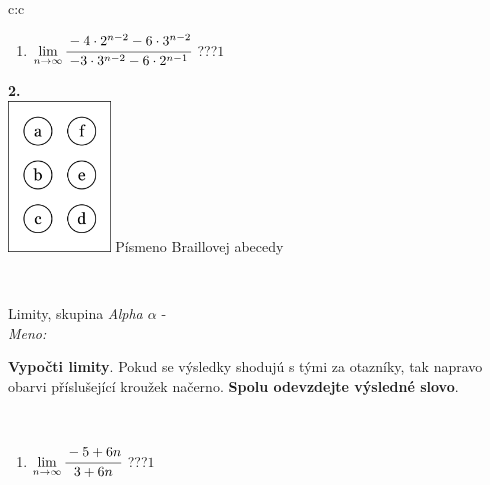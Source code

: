 \documentclass[10pt]{report}
\begin{document}
\begin{tabular}{c:c}
\begin{minipage}[c][104.5mm][t]{0.5\linewidth}
\begin{center}
\begin{minipage}{0.79\linewidth}
\begin{center}
\begin{varwidth}{\linewidth}
\begin{enumerate}
\item $\lim\limits_{n\to\infty}\cfrac{-4\cdot 2^{n-2}-6\cdot 3^{n-2}}{-3\cdot 3^{n-2}-6\cdot 2^{n-1}}$\quad \dotfill\; ???\;\dotfill \quad $1$
\end{enumerate}
\end{varwidth}
\end{center}
\end{minipage}
\begin{minipage}{0.20\linewidth}
\begin{center}
{\Huge\bfseries 2.} \\[2mm]
\includegraphics[height=40mm]{../images/braille.png}
{\small Písmeno Braillovej abecedy}
\end{center}
\end{minipage}
\end{center}
\end{minipage}
\\ \hdashline
\begin{minipage}[c][104.5mm][t]{0.5\linewidth}
\begin{center}
\vspace{7mm}
{\huge Limity, skupina \textit{Alpha $\alpha$} -}\\[5mm]
\textit{Meno:}\phantom{xxxxxxxxxxxxxxxxxxxxxxxxxxxxxxxxxxxxxxxxxxxxxxxxxxxxxxxxxxxxxxxxx}\\[5mm]
\begin{minipage}{0.95\linewidth}
\begin{center}
\textbf{Vypočti limity}. Pokud se výsledky shodujú s tými za otazníky, tak napravo\\obarvi příslušející kroužek načerno. \textbf{Spolu odevzdejte výsledné slovo}.
\end{center}
\end{minipage}
\\[1mm]
\begin{minipage}{0.79\linewidth}
\begin{center}
\begin{varwidth}{\linewidth}
\begin{enumerate}
\normalsize
\item $\lim\limits_{n\to\infty}\cfrac{-5+6n}{3+6n}$\quad \dotfill\; ???\;\dotfill \quad $1$

\end{enumerate}
\end{varwidth}
\end{center}
\end{minipage}
\end{center}
\end{minipage}
\end{tabular}
\end{document}

